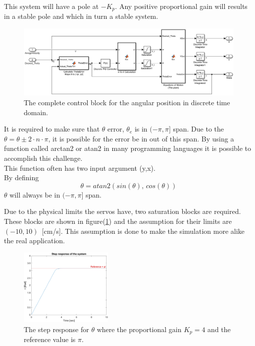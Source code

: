 This system will have a pole at $-K_p$.
Any positive proportional gain will results in a stable pole and which in turn a stable system.
\begin{figure}[ht]
\centering
\includegraphics[width=\textwidth]{sections/assets/Theta_PID.PNG}
\caption{The complete control block for the angular position in discrete time domain.}
\label{fig:PID1}
\end{figure}
 
It is required to make sure that $\theta$ error, $\theta_e$ is in $(-\pi,\pi]$ span. Due to the $\theta = \theta \pm 2 \cdot n \cdot \pi$, it is possible for the error be in out of this span.
By using a function called arctan2 or atan2 in many programming languages it is possible to accomplish this challenge.\\
This function often has two input argument (y,x).\\ 
By defining 
\begin{equation}
\theta = atan2(sin(\theta),\, cos(\theta))
\end{equation}
$\theta$ will always be in $(-\pi,\pi]$ span.

Due to the physical limits the servos have, two saturation blocks are required.
These blocks are shown in figure(\ref{fig:PID1}) and the assumption for their limits are $(-10,10)$~[cm/s]. 
This assumption is done to make the simulation more alike the real application.
\begin{figure}[ht]
\centering
\includegraphics[width=0.4\textwidth]{sections/assets/Theta_pi_stepresponse.png}
\caption{The step response for $\theta$ where the proportional gain $K_p = 4$ and the reference value is $\pi$.}
\label{fig:Theta_Step}
\end{figure}

